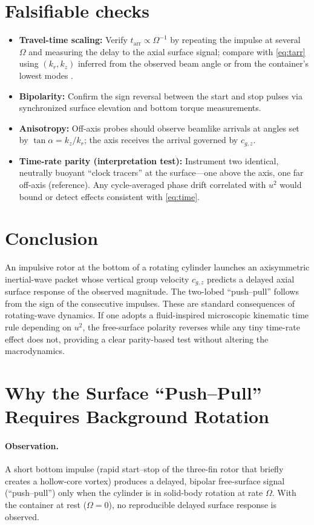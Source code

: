 \documentclass[12pt]{article}
\newcommand{\Om}{\Omega}
\begin{document}
\section{Falsifiable checks}
\begin{itemize}
\item \textbf{Travel-time scaling:} Verify $t_{\mathrm{arr}}\propto \Om^{-1}$ by repeating the impulse at several $\Om$ and measuring the delay to the axial surface signal; compare with \eqref{eq:tarr} using $(k_r,k_z)$ inferred from the observed beam angle or from the container's lowest modes \cite{Greenspan1968}.
\item \textbf{Bipolarity:} Confirm the sign reversal between the start and stop pulses via synchronized surface elevation and bottom torque measurements.
\item \textbf{Anisotropy:} Off-axis probes should observe beamlike arrivals at angles set by $\tan\alpha=k_z/k_r$; the axis receives the arrival governed by $c_{g,z}$.
\item \textbf{Time-rate parity (interpretation test):} Instrument two identical, neutrally buoyant ``clock tracers'' at the surface---one above the axis, one far off-axis (reference). Any cycle-averaged phase drift correlated with $u^2$ would bound or detect effects consistent with \eqref{eq:time}.
\end{itemize}

\section*{Conclusion}
An impulsive rotor at the bottom of a rotating cylinder launches an axisymmetric inertial-wave packet whose vertical group velocity $c_{g,z}$ predicts a delayed axial surface response of the observed magnitude. The two-lobed ``push--pull'' follows from the sign of the consecutive impulses. These are standard consequences of rotating-wave dynamics. If one adopts a fluid-inspired microscopic kinematic time rule depending on $u^2$, the free-surface polarity reverses while any tiny time-rate effect does not, providing a clear parity-based test without altering the macrodynamics.

\section{Why the Surface ``Push--Pull'' Requires Background Rotation}
\label{sec:why-rotation}

\paragraph{Observation.}
A short bottom impulse (rapid start--stop of the three-fin rotor that briefly creates a hollow-core vortex) produces a delayed, bipolar free-surface signal (``push--pull'') only when the cylinder is in solid-body rotation at rate $\Omega$. With the container at rest ($\Omega=0$), no reproducible delayed surface response is observed.
\end{document}
